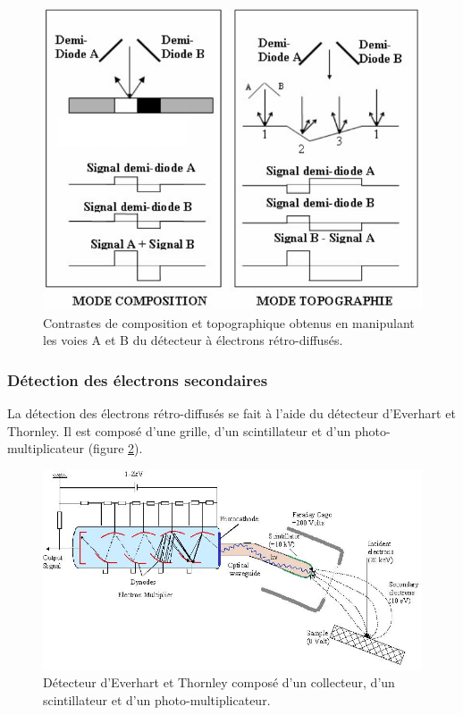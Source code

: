 \documentclass[a4paper,12pt]{article}
\newcommand\ett{Everhart et Thornley\xspace}
\begin{document}
\begin{figure}
\centering
\includegraphics[width = 0.9 \textwidth]{images/detect_sc_contraste.png}
\caption{Contrastes de composition et topographique obtenus en manipulant les voies A et B du détecteur à électrons rétro-diffusés.}
\label{fig:detect_sc_contraste}
\end{figure}







\subsubsection*{Détection des électrons secondaires}

La détection des électrons rétro-diffusés se fait à l'aide du détecteur d'\ett. Il est composé d'une grille, d'un scintillateur et d'un photo-multiplicateur (figure \ref{fig:detect_ett}).

\begin{figure}
\centering
\includegraphics[width = 0.9 \textwidth]{images/detect_ett.png}
\caption{Détecteur d'\ett composé d'un collecteur, d'un scintillateur et d'un photo-multiplicateur.}
\label{fig:detect_ett}
\end{figure}
 
\end{document}
